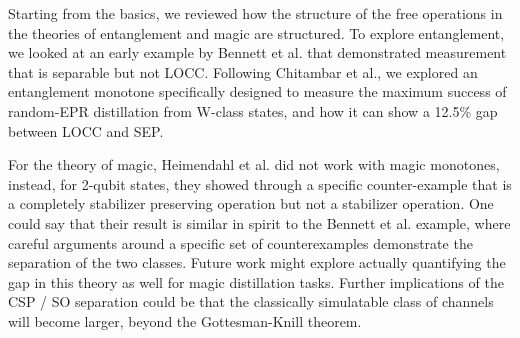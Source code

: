 Starting from the basics, we reviewed how the structure of the free operations in the theories of entanglement and magic are structured.  To explore entanglement, we looked at an early example by Bennett et al. that demonstrated measurement that is separable but not LOCC. Following Chitambar et al., we explored an entanglement monotone specifically designed to measure the maximum success of random-EPR distillation from W-class states, and how it can show a 12.5\% gap between LOCC and SEP. 

For the theory of magic, Heimendahl et al. did not work with magic monotones, instead, for 2-qubit states, they showed through a specific counter-example that is a completely stabilizer preserving operation but not a stabilizer operation. One could say that their result is similar in spirit to the Bennett et al. example, where careful arguments around a specific set of counterexamples demonstrate the separation of the two classes. Future work might explore actually quantifying the gap in this theory as well for magic distillation tasks. Further implications of the CSP / SO separation could be that the classically simulatable class of channels will become larger, beyond the Gottesman-Knill theorem. 
